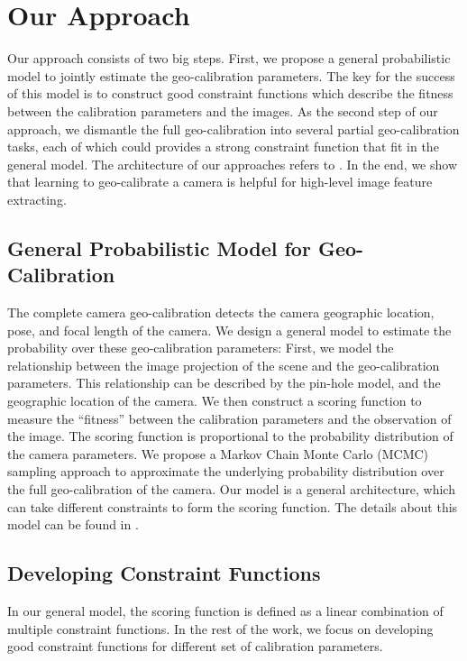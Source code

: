 \section{Our Approach}
Our approach consists of two big steps. First, we propose a general
probabilistic model to jointly estimate the geo-calibration
parameters. The key for the success of this model is to construct good
constraint functions which describe the fitness between the calibration
parameters and the images. As the second step of our approach, we
dismantle the full geo-calibration into several partial
geo-calibration tasks, each of which could provides a strong constraint
function that fit in the general model. The architecture of
our approaches refers to .
%
In the end, we show that learning to geo-calibrate a camera is helpful
for high-level image feature extracting.


\subsection{General Probabilistic Model for Geo-Calibration}
The complete camera geo-calibration detects the camera
geographic location, pose, and focal length of the camera.  We
design a general model to estimate the probability over these
geo-calibration parameters: First, we model the relationship between the
image projection of the scene and the geo-calibration parameters. This
relationship can be described by the pin-hole model, and
the geographic location of the camera.
We then construct a scoring function to measure the ``fitness'' between the
calibration parameters and the observation of the image. 
The scoring function is proportional to the probability distribution
of the camera parameters. We propose a Markov Chain Monte
Carlo (MCMC) sampling approach to approximate the underlying
probability distribution over the full geo-calibration of the camera.
Our model is a general architecture, which can take different
constraints to form the scoring function. The details about this model
can be found in .

\subsection{Developing Constraint Functions}
In our general model, the scoring function is defined as a linear
combination of multiple constraint functions.
In the rest of the work, we focus on developing good constraint
functions for different set of calibration parameters. 

